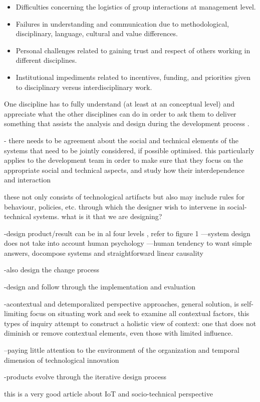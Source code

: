 \begin{itemize}
\item Difficulties concerning the logistics of group interactions at management level. 
\item Failures in understanding and communication due to methodological, disciplinary, language, cultural and value differences. 
\item  Personal challenges related to gaining trust and respect of others working in different disciplines.
\item  Institutional impediments related to incentives, funding, and priorities given to disciplinary versus interdisciplinary work.
\end{itemize}
% 
One discipline has to fully understand (at least at an conceptual level) and appreciate what the other disciplines can do in order to ask them to deliver something that assists the analysis and design during the development process \cite{Baxter2011}. 


\begin{svgraybox}








- there needs to be agreement about the social and technical elements of the systems that need to be jointly considered, if possible optimised. this particularly applies to the development team in order to make sure that they focus on the appropriate social and technical aspects, and study how their interdependence and interaction 






 these not only consists of technological artifacts but also may include rules for behaviour, policies, etc. through which the designer wish to intervene in social-technical systems. what is it that we are designing? 

-design product/result can be in al four levels , refer to figure 1
---system design does not take into account human psychology
---human tendency to want simple answers, docompose systems and straightforward linear causality 

-also design the change process

-design and follow through the implementation and evaluation 

-acontextual and detemporalized perspective approaches, general solution, is self-limiting 
focus on situating work and seek to examine all contextual factors, this types of inquiry attempt to construct a holistic view of context: one that does not diminish or remove contextual elements, even those with limited influence. 

--paying little attention to the environment of the organization and temporal dimension of technological innovation  \cite{Sawyer2014}

-products evolve through the iterative design process

\end{svgraybox}


\begin{svgraybox}

\item \cite{Shin2014} this is a very good article about IoT and socio-technical perspective 

\end{svgraybox}

